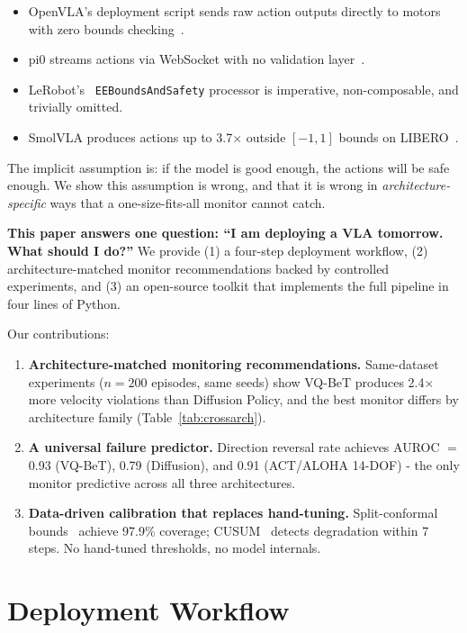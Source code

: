 \documentclass[conference]{IEEEtran}
\begin{document}
\begin{itemize}
    \item OpenVLA's deployment script sends raw action outputs directly to motors with zero bounds checking~\cite{openvla}.
    \item pi0 streams actions via WebSocket with no validation layer~\cite{pi0}.
    \item LeRobot's~\cite{lerobot} \texttt{EEBoundsAndSafety} processor is imperative, non-composable, and trivially omitted.
    \item SmolVLA produces actions up to 3.7$\times$ outside $[-1, 1]$ bounds on LIBERO~\cite{libero}.
\end{itemize}

\noindent The implicit assumption is: if the model is good enough, the actions will be safe enough.
We show this assumption is wrong, and that it is wrong in \emph{architecture-specific} ways that a one-size-fits-all monitor cannot catch.

\textbf{This paper answers one question: ``I am deploying a VLA tomorrow. What should I do?''}
We provide (1) a four-step deployment workflow, (2) architecture-matched monitor recommendations backed by controlled experiments, and (3) an open-source toolkit that implements the full pipeline in four lines of Python.

Our contributions:
\begin{enumerate}
    \item \textbf{Architecture-matched monitoring recommendations.} Same-dataset experiments ($n{=}200$ episodes, same seeds) show VQ-BeT produces 2.4$\times$ more velocity violations than Diffusion Policy, and the best monitor differs by architecture family (Table~\ref{tab:crossarch}).
    \item \textbf{A universal failure predictor.} Direction reversal rate achieves AUROC ${=}$ 0.93 (VQ-BeT), 0.79 (Diffusion), and 0.91 (ACT/ALOHA 14-DOF) - the only monitor predictive across all three architectures.
    \item \textbf{Data-driven calibration that replaces hand-tuning.} Split-conformal bounds~\cite{vovk2005} achieve 97.9\% coverage; CUSUM~\cite{page1954} detects degradation within 7 steps. No hand-tuned thresholds, no model internals.
\end{enumerate}

\section{Deployment Workflow}
\label{sec:workflow}
\end{document}
